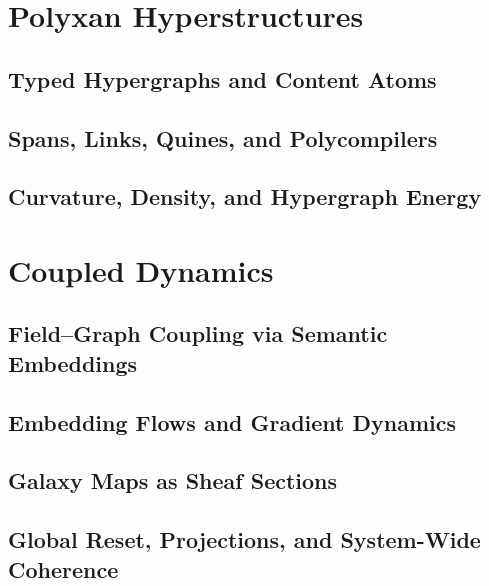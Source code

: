 \documentclass[11pt,oneside]{book}
\begin{document}

\part{Polyxan Hyperstructures}

\chapter{Typed Hypergraphs and Content Atoms}


\chapter{Spans, Links, Quines, and Polycompilers}


\chapter{Curvature, Density, and Hypergraph Energy}



\part{Coupled Dynamics}

\chapter{Field–Graph Coupling via Semantic Embeddings}


\chapter{Embedding Flows and Gradient Dynamics}


\chapter{Galaxy Maps as Sheaf Sections}


\chapter{Global Reset, Projections, and System-Wide Coherence}

\end{document}
